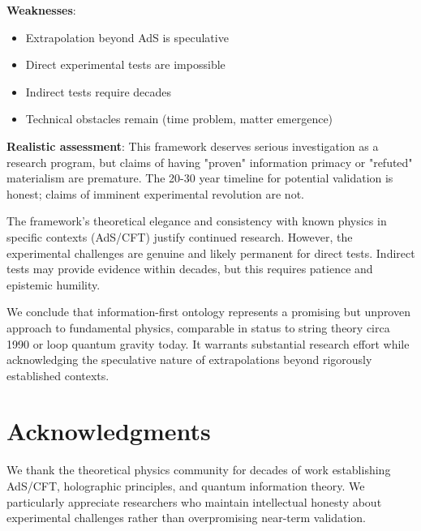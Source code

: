 \documentclass[12pt,twocolumn]{article}
\theoremstyle{definition}
\theoremstyle{remark}
\begin{document}
\textbf{Weaknesses}:
\begin{itemize}
\item Extrapolation beyond AdS is speculative
\item Direct experimental tests are impossible
\item Indirect tests require decades
\item Technical obstacles remain (time problem, matter emergence)
\end{itemize}

\textbf{Realistic assessment}: This framework deserves serious investigation as a research program, but claims of having "proven" information primacy or "refuted" materialism are premature. The 20-30 year timeline for potential validation is honest; claims of imminent experimental revolution are not.

The framework's theoretical elegance and consistency with known physics in specific contexts (AdS/CFT) justify continued research. However, the experimental challenges are genuine and likely permanent for direct tests. Indirect tests may provide evidence within decades, but this requires patience and epistemic humility.

We conclude that information-first ontology represents a promising but unproven approach to fundamental physics, comparable in status to string theory circa 1990 or loop quantum gravity today. It warrants substantial research effort while acknowledging the speculative nature of extrapolations beyond rigorously established contexts.

\section*{Acknowledgments}

We thank the theoretical physics community for decades of work establishing AdS/CFT, holographic principles, and quantum information theory. We particularly appreciate researchers who maintain intellectual honesty about experimental challenges rather than overpromising near-term validation.
\end{document}
